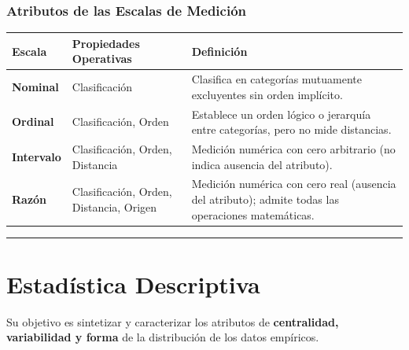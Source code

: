 \documentclass[
  spanish,
  letterpaper,
  DIV=11,
  numbers=noendperiod]{scrreprt}
\newcounter{none} %
\begin{document}
\subsubsection{Atributos de las Escalas de
Medición}\label{atributos-de-las-escalas-de-mediciuxf3n}

{\def\LTcaptype{none} %
\begin{longtable}[]{@{}
  >{\raggedright\arraybackslash}p{}
  >{\raggedright\arraybackslash}p{}
  >{\raggedright\arraybackslash}p{}@{}}
\toprule\noalign{}
\begin{minipage}[b]{\linewidth}\raggedright
Escala
\end{minipage} & \begin{minipage}[b]{\linewidth}\raggedright
Propiedades Operativas
\end{minipage} & \begin{minipage}[b]{\linewidth}\raggedright
Definición
\end{minipage} \\
\midrule\noalign{}
\endhead
\bottomrule\noalign{}
\endlastfoot
\textbf{Nominal} & Clasificación & Clasifica en categorías mutuamente
excluyentes sin orden implícito. \\
\textbf{Ordinal} & Clasificación, Orden & Establece un orden lógico o
jerarquía entre categorías, pero no mide distancias. \\
\textbf{Intervalo} & Clasificación, Orden, Distancia & Medición numérica
con cero arbitrario (no indica ausencia del atributo). \\
\textbf{Razón} & Clasificación, Orden, Distancia, Origen & Medición
numérica con cero real (ausencia del atributo); admite todas las
operaciones matemáticas. \\
\end{longtable}
}

\begin{center}\rule{0.5\linewidth}{0.5pt}\end{center}

\section{Estadística Descriptiva}\label{estaduxedstica-descriptiva}

Su objetivo es sintetizar y caracterizar los atributos de
\textbf{centralidad, variabilidad y forma} de la distribución de los
datos empíricos.
\end{document}

